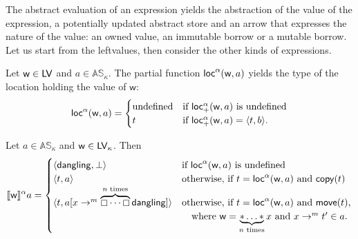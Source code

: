 The abstract evaluation of an expression yields the abstraction of the
value of the expression, a potentially updated abstract store
and an arrow that expresses the nature of the value: an owned value, an immutable borrow
or a mutable borrow. Let us start from the leftvalues, then consider the other kinds of
expressions.

\begin{definition}\label{def:abstract_location}
  Let $\mathsf{w}\in\Leftvalues$ and $a\in\mathbb{AS}_\kappa$. The partial function
  $\loca(\mathsf{w},a)$ yields the type of the location holding the value of $\mathsf{w}$:
  \[
  \loca(\mathsf{w},a)=\begin{cases}
  \text{undefined} & \text{if $\locreada(\mathsf{w},a)$ is undefined}\\
  t & \text{if $\locreada(\mathsf{w},a)=\langle t,b\rangle$.}
  \end{cases}
  \]
\end{definition}

\begin{definition}\label{def:abstract_semantics_leftvalues}
  Let $a\in\mathbb{AS}_\kappa$ and $\mathsf{w}\in\Leftvalues_\kappa$. Then
  \[
  \dena[\mathsf{w}]{a}=\begin{cases}
  \langle\mathsf{dangling},\bot\rangle & \text{if $\loca(\mathsf{w},a)$ is undefined}\\
  \langle t, a\rangle & \text{otherwise, if $t=\loca(\mathsf{w},a)$ and $\copytype(t)$}\\
  \langle t, a[x\to^m\overbrace{\boxempty\cdots\boxempty}^{n\text{ times}}\mathsf{dangling}]\rangle & \text{otherwise, if $t=\loca(\mathsf{w},a)$ and $\movetype(t)$,}\\
  & \quad\text{where $\mathsf{w}=\underbrace{*\ldots*}_{n\text{ times}}x$ and $x\to^mt'\in a$.}
  \end{cases}
  \]
\end{definition}

